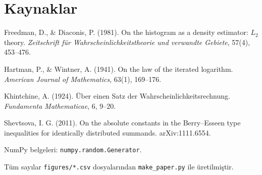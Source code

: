 \documentclass[11pt,a4paper]{article}
\begin{document}
\section*{Kaynaklar}
{\small
\setlength{\parskip}{2pt}
\hangindent=1.27cm Freedman, D., \& Diaconis, P. (1981). On the histogram as a density estimator: $L_2$ theory. \textit{Zeitschrift für
Wahrscheinlichkeitstheorie und verwandte Gebiete}, 57(4), 453--476.\par
\hangindent=1.27cm Hartman, P., \& Wintner, A. (1941). On the law of the iterated logarithm. \textit{American Journal of Mathematics}, 63(1), 169--176.\par
\hangindent=1.27cm Khintchine, A. (1924). Über einen Satz der Wahrscheinlichkeitsrechnung. \textit{Fundamenta Mathematicae}, 6, 9--20.\par
\hangindent=1.27cm Shevtsova, I. G. (2011). On the absolute constants in the Berry--Esseen type inequalities for identically distributed summands.
arXiv:1111.6554.\par
\hangindent=1.27cm NumPy belgeleri: \texttt{numpy.random.Generator}.\par

\smallskip
Tüm sayılar
\texttt{figures/*.csv} dosyalarından \texttt{make\_paper.py} ile üretilmiştir.
}
\end{document}
